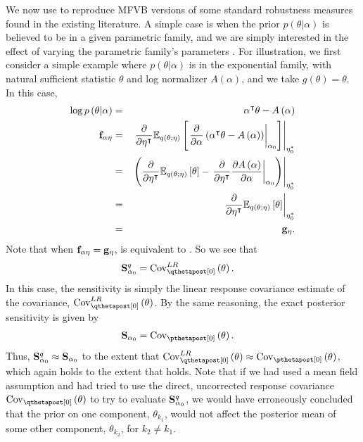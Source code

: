 \documentclass{article}\usepackage[]{graphicx}\usepackage[]{color}
\theoremstyle{definition}
\theoremstyle{plain}
\theoremstyle{plain}
\theoremstyle{plain}
\theoremstyle{definition}
\theoremstyle{plain}
\theoremstyle{plain}
\begin{document}
We now use  to reproduce
MFVB versions of some standard robustness measures found in the existing
literature. A simple case is when the prior $p\left(\theta\vert\alpha\right)$
is believed to be in a given parametric family, and we are simply
interested in the effect of varying the parametric family's parameters
\citep{basu:1996:local,giordano:2016:robust}. For illustration, we
first consider a simple example where $p\left(\theta\vert\alpha\right)$
is in the exponential family, with natural sufficient statistic $\theta$
and log normalizer $A\left(\alpha\right)$, and we take $g\left(\theta\right)=\theta$.
In this case,
\begin{eqnarray*}
\log p\left(\theta\vert\alpha\right) & = &
    \alpha^{\intercal}\theta-A\left(\alpha\right)\\
\mathbf{f}_{\alpha\eta} & = & \left.\frac{\partial}{\partial\eta^{\intercal}}
    \mathbb{E}_{q\left(\theta;\eta\right)}\left[\left.\frac{\partial}
    {\partial\alpha}\left(\alpha^{\intercal}\theta -
    A\left(\alpha\right)\right)\right|_{\alpha_{0}}\right]\right|_{\eta_{0}^{*}}\\
 & = & \left.\left(\frac{\partial}{\partial\eta^{\intercal}}
    \mathbb{E}_{q\left(\theta;\eta\right)}\left[\theta\right]-\left.
    \frac{\partial}{\partial\eta^{\intercal}}
    \frac{\partial A\left(\alpha\right)}
        {\partial\alpha}\right|_{\alpha_{0}}\right)\right|_{\eta_{0}^{*}}\\
 & = & \left.\frac{\partial}{\partial\eta^{\intercal}}
    \mathbb{E}_{q\left(\theta;\eta\right)}\left[\theta\right]\right|_{\eta_{0}^{*}}\\
 & = & \mathbf{g}_{\eta}.
\end{eqnarray*}
Note that when $\mathbf{f}_{\alpha\eta}=\mathbf{g}_{\eta}$,
is equivalent to . So we see that
\begin{align*}
\qsens & =\lrvbcov\left(\theta\right).
\end{align*}
In this case, the sensitivity is simply the linear response covariance
estimate of the covariance, $\lrvbcov\left(\theta\right)$. By
the same reasoning, the exact posterior sensitivity is given by
\begin{align*}
\psens & =\pcov\left(\theta\right).
\end{align*}
Thus, $\mathbf{S}_{\alpha_{0}}^{q}\approx\mathbf{S}_{\alpha_{0}}$ to the extent that
$\lrvbcov\left(\theta\right)\approx\pcov\left(\theta\right)$, which again holds
to the extent that  holds. Note that if we had used
a mean field assumption and had tried to use the direct, uncorrected response
covariance $\qcov\left(\theta\right)$ to try to evaluate $\mathbf{S}_{\alpha_{0}}^{q}$, we would have
erroneously concluded that the prior on one component, $\theta_{k_{1}}$, would
not affect the posterior mean of some other component, $\theta_{k_{2}}$, for
$k_{2}\ne k_{1}$.
\end{document}
